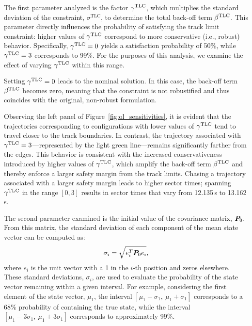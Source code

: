 The first parameter analyzed is the factor $\gamma^\textrm{TLC}$, which multiplies the standard deviation of the constraint, $\sigma^\textrm{TLC}$, to determine the total back-off term $\beta^\textrm{TLC}$. This parameter directly influences the probability of satisfying the track limit constraint: higher values of $\gamma^\textrm{TLC}$ correspond to more conservative (i.e., robust) behavior. Specifically, $\gamma^\textrm{TLC} = 0$ yields a satisfaction probability of 50\%, while $\gamma^\textrm{TLC} = 3$ corresponds to 99\%. For the purposes of this analysis, we examine the effect of varying $\gamma^\textrm{TLC}$ within this range. 

Setting $\gamma^\textrm{TLC} = 0$ leads to the nominal solution. In this case, the back-off term $\beta^\textrm{TLC}$ becomes zero, meaning that the constraint is not robustified and thus coincides with the original, non-robust formulation. 

Observing the left panel of Figure~\ref{fig:ol_sensitivities}, it is evident that the trajectories corresponding to configurations with lower values of $\gamma^\textrm{TLC}$ tend to travel closer to the track boundaries. In contrast, the trajectory associated with $\gamma^\textrm{TLC} = 3$---represented by the light green line---remains significantly farther from the edges.
This behavior is consistent with the increased conservativeness introduced by higher values of $\gamma^\textrm{TLC}$, which amplify the back-off term $\beta^\textrm{TLC}$ and thereby enforce a larger safety margin from the track limits.
Chasing a trajectory associated with a larger safety margin leads to higher sector times; spanning $\gamma^\textrm{TLC}$ in the range $\left[0,3\right]$ results in sector times that vary from 12.135\,s to 13.162\,s.

The second parameter examined is the initial value of the covariance matrix, $\boldsymbol{P}_0$. From this matrix, the standard deviation of each component of the mean state vector can be computed as:
\begin{equation}
	\sigma_i = \sqrt{e_i^T \bP_0 e_i},\label{eq:sigma_from_P}
\end{equation}
where $e_i$ is the unit vector with a 1 in the $i$-th position and zeros elsewhere. These standard deviations, $\sigma_i$, are used to evaluate the probability of the state vector remaining within a given interval. For example, considering the first element of the state vector, $\mu_1$, the interval $\left[\mu_1 - \sigma_1,\ \mu_1 + \sigma_1\right]$ corresponds to a 68\% probability of containing the true state, while the interval $\left[\mu_1 - 3\sigma_1,\ \mu_1 + 3\sigma_1\right]$ corresponds to approximately 99\%.

